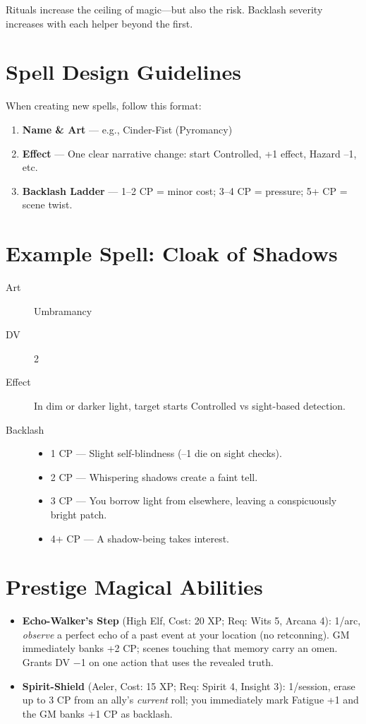 Rituals increase the ceiling of magic—but also the risk. Backlash severity increases with each helper beyond the first.

\section{Spell Design Guidelines}

When creating new spells, follow this format:

\begin{enumerate}
  \item \textbf{Name \& Art} — e.g., Cinder-Fist (Pyromancy)
  \item \textbf{Effect} — One clear narrative change: start Controlled, +1 effect, Hazard –1, etc.
  \item \textbf{Backlash Ladder} — 1–2 CP = minor cost; 3–4 CP = pressure; 5+ CP = scene twist.
\end{enumerate}

\section{Example Spell: Cloak of Shadows}

\begin{description}
  \item[Art] Umbramancy
  \item[DV] 2
  \item[Effect] In dim or darker light, target starts Controlled vs sight-based detection.
  \item[Backlash]
    \begin{itemize}
      \item 1 CP — Slight self-blindness (–1 die on sight checks).
      \item 2 CP — Whispering shadows create a faint tell.
      \item 3 CP — You borrow light from elsewhere, leaving a conspicuously bright patch.
      \item 4+ CP — A shadow-being takes interest.
    \end{itemize}
\end{description}

\section{Prestige Magical Abilities}

\begin{itemize}
    \item \textbf{Echo-Walker's Step} (High Elf, Cost: 20 XP; Req: Wits 5, Arcana 4): 
1/arc, \emph{observe} a perfect echo of a past event at your location (no retconning). 
GM immediately banks +2 CP; scenes touching that memory carry an omen. Grants DV −1 on one action that uses the revealed truth.
    \item \textbf{Spirit-Shield} (Aeler, Cost: 15 XP; Req: Spirit 4, Insight 3): 
1/session, erase up to 3 CP from an ally's \emph{current} roll; you immediately mark Fatigue +1 and the GM banks +1 CP as backlash.
\end{itemize}

